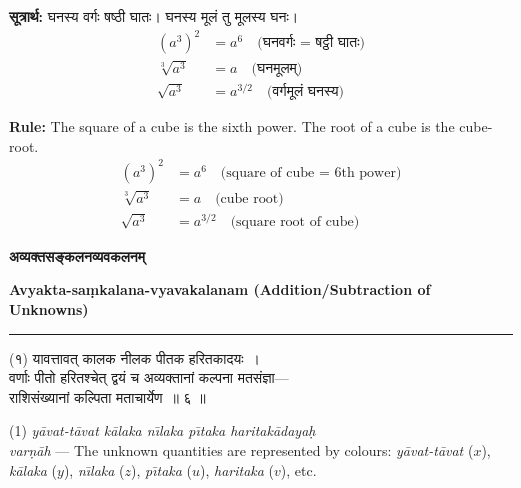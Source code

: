 \documentclass[11pt,a4paper]{article}
\newcommand{\dev}[1]{{\devanagarifont #1}}
\newcommand{\bicol}[2]{%
\noindent%
\begin{minipage}[t]{0.48\textwidth}
\begin{flushleft}
\small
#1
\end{flushleft}
\end{minipage}%
\hfill%
\begin{minipage}[t]{0.48\textwidth}
\begin{flushleft}
\small
#2
\end{flushleft}
\end{minipage}%
\vspace{0.4em}
}
\newcommand{\bicolverse}[2]{%
\par\noindent%
\begin{minipage}[t]{0.48\textwidth}
\centering
\color{versecolor}
\devanagarifont
\small
#1
\end{minipage}%
\hfill%
\begin{minipage}[t]{0.48\textwidth}
\centering
\color{versecolor}
\small
#2
\end{minipage}%
\par\vspace{0.4em}
}
\newcommand{\sectionbicol}[2]{%
\vspace{0.5em}
\noindent%
\begin{minipage}[t]{0.48\textwidth}
\begin{center}
\large\bfseries\color{sectioncolor}
\dev{#1}
\end{center}
\end{minipage}%
\hfill%
\begin{minipage}[t]{0.48\textwidth}
\begin{center}
\large\bfseries\color{sectioncolor}
#2
\end{center}
\end{minipage}%
\vspace{0.3em}
\noindent\rule{\textwidth}{0.4pt}
}
\begin{document}
\vspace{0.5cm}

\bicol{%
\textbf{सूत्रार्थ:} घनस्य वर्गः षष्ठी घातः। घनस्य मूलं तु मूलस्य घनः।
\begin{align*}
(a^3)^2 &= a^6 \quad \text{(घनवर्गः = षट्ठी घातः)} \\
\sqrt[3]{a^3} &= a \quad \text{(घनमूलम्)} \\
\sqrt{a^3} &= a^{3/2} \quad \text{(वर्गमूलं घनस्य)}
\end{align*}
}{%
\textbf{Rule:} The square of a cube is the sixth power. The root of a cube is the cube-root.
\begin{align*}
(a^3)^2 &= a^6 \quad \text{(square of cube = 6th power)} \\
\sqrt[3]{a^3} &= a \quad \text{(cube root)} \\
\sqrt{a^3} &= a^{3/2} \quad \text{(square root of cube)}
\end{align*}
}

\clearpage

\sectionbicol{अव्यक्तसङ्कलनव्यवकलनम्}{Avyakta-sa\d{m}kalana-vyavakalanam (Addition/Subtraction of Unknowns)}

\vspace{0.3cm}

\bicolverse{%
(१) यावत्तावत् कालक नीलक पीतक हरितकादयः~।\\
वर्णाः पीतो हरितश्चेत् द्वयं च अव्यक्तानां कल्पना मतसंज्ञा—\\
राशिसंख्यानां कल्पिता मताचार्येण~॥ ६ ॥
}{%
(1) \textit{y\={a}vat-t\={a}vat k\={a}laka n\={\i}laka p\={\i}taka haritak\={a}daya\d{h}}\\
\textit{var\d{n}\={a}h} --- The unknown quantities are represented by colours:
\textit{y\={a}vat-t\={a}vat} ($x$), \textit{k\={a}laka} ($y$), \textit{n\={\i}laka} ($z$), \textit{p\={\i}taka} ($u$), \textit{haritaka} ($v$), etc.
}

\vspace{0.5cm}
\end{document}

